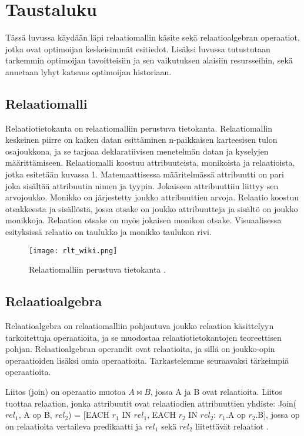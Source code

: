 \documentclass[finnish]{tktltiki2}
\theoremstyle{definition}
\theoremstyle{remark}
\begin{document}
\section{Taustaluku}
Tässä luvussa käydään läpi relaatiomallin käsite sekä relaatioalgebran operaatiot, jotka ovat optimoijan keskeisimmät esitiedot. Lisäksi luvussa tutustutaan tarkemmin optimoijan tavoitteisiin ja sen vaikutuksen alaisiin resursseihin, sekä annetaan lyhyt katsaus optimoijan historiaan.
\subsection{Relaatiomalli}
Relaatiotietokanta on relaatiomalliin \cite{codd1970relational} perustuva tietokanta. Relaatiomallin keskeinen piirre on kaiken datan esittäminen n-paikkaisen karteesisen tulon osajoukkona, ja se tarjoaa deklaratiivisen menetelmän datan ja kyselyjen määrittämiseen. Relaatiomalli koostuu attribuuteista, monikoista ja relaatioista, jotka esitetään kuvassa 1. Matemaattisessa määritelmässä attribuutti on pari joka sisältää attribuutin nimen ja tyypin. Jokaiseen attribuuttiin liittyy sen arvojoukko. Monikko on järjestetty joukko attribuuttien arvoja. Relaatio koostuu otsakkeesta ja sisällöstä, jossa otsake on joukko attribuutteja ja sisältö on joukko monikkoja. Relaation otsake on myös jokaisen monikon otsake. Visuaalisessa esityksissä relaatio on taulukko ja monikko taulukon rivi. 

\begin{figure}[!h] 
  \caption{Relaatiomalliin perustuva tietokanta \cite{wiki2008}.}
  \centering
    \texttt{[image: rlt\_wiki.png]}
\end{figure}

\subsection{Relaatioalgebra}
Relaatioalgebra on relaatiomalliin pohjautuva joukko relaation käsittelyyn tarkoitettuja operaatioita, ja se muodostaa relaatiotietokantojen teoreettisen pohjan. Relaatioalgebran operandit ovat relaatioita, ja sillä on joukko-opin operaatioiden lisäksi omia operaatioita. Tarkastelemme seuraavaksi tärkeimpiä operaatioita.

Liitos (join) on operaatio muotoa $A\bowtie B$, jossa A ja B ovat relaatioita. Liitos tuottaa relaation, jonka attribuutit ovat relaatiodien attribuuttien yhdiste: 
\newline Join($rel_ 1$, A op B, $rel_2$) = [EACH $r_1$ IN $rel_1$, EACH $r_2$ IN $rel_2$: $r_1$.A op $r_2$.B], jossa op on relaatioita vertaileva predikaatti ja $rel_1$ sekä $rel_2$ liitettävät relaatiot \cite{jarke1984}.
\end{document}
